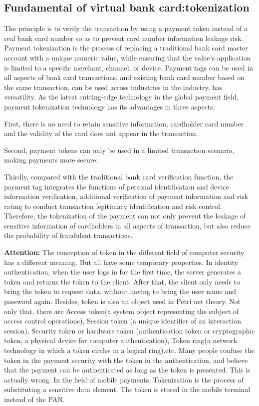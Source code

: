 \documentclass[journal]{IEEEtran}
\begin{document}
\subsection{Fundamental of virtual bank card:tokenization }


The principle is to verify the transaction by using a payment token instead of a real bank card number so as to prevent card number information leakage risk. Payment tokenization is the process of replacing a traditional bank card master account with a unique numeric value, while ensuring that the value's application is limited to a specific merchant, channel, or device. Payment tags can be used in all aspects of bank card transactions, and existing bank card number based on the same transaction, can be used across industries in the industry, has versatility.
As the latest cutting-edge technology in the global payment field, payment tokenization technology has its advantages in three aspects:

First, there is no need to retain sensitive information, cardholder card number and the validity of the card does not appear in the transaction;

Second, payment tokens can only be used in a limited transaction scenario, making payments more secure;

Thirdly, compared with the traditional bank card verification function, the payment tag integrates the functions of personal identification and device information verification, additional verification of payment information and risk rating to conduct transaction legitimacy identification and risk control. Therefore, the tokenization of the payment can not only prevent the leakage of sensitive information of cardholders in all aspects of transaction, but also reduce the probability of fraudulent transactions.

\textbf{Attention:} The conception of token in the different field of computer security has a different meaning. But all have some temporary properties. In identity authentication, when the user logs in for the first time, the server generates a token and returns the token to the client. After that, the client only needs to bring the token to request data, without having to bring the user name and password again. Besides, token is also an object used in Petri net theory. Not only that, there are Access token(a system object representing the subject of access control operations), Session token (a unique identifier of an interaction session), Security token or hardware token (authentication token or cryptographic token, a physical device for computer authentication), Token ring(a network technology in which a token circles in a logical ring),etc. Many people confuse the token in the payment security with the token in the authentication, and believe that the payment can be authenticated as long as the token is presented. This is actually wrong. In the field of mobile payments, Tokenization is the process of substituting a sensitive data element. The token is stored in the mobile terminal instead of the PAN.
\end{document}
